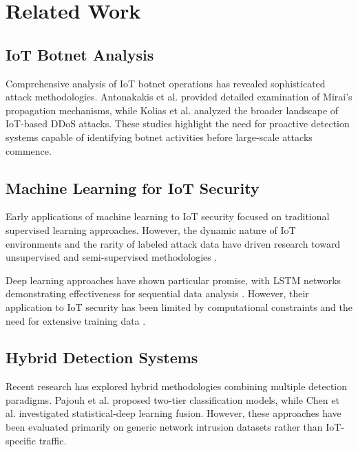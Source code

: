 \documentclass[conference]{IEEEtran}
\begin{document}
\section{Related Work}

\subsection{IoT Botnet Analysis}

Comprehensive analysis of IoT botnet operations has revealed sophisticated attack methodologies. Antonakakis et al. \cite{antonakakis2017understanding} provided detailed examination of Mirai's propagation mechanisms, while Kolias et al. \cite{kolias2017ddos} analyzed the broader landscape of IoT-based DDoS attacks. These studies highlight the need for proactive detection systems capable of identifying botnet activities before large-scale attacks commence.

\subsection{Machine Learning for IoT Security}

Early applications of machine learning to IoT security focused on traditional supervised learning approaches. However, the dynamic nature of IoT environments and the rarity of labeled attack data have driven research toward unsupervised and semi-supervised methodologies \cite{lopez2017network}.

Deep learning approaches have shown particular promise, with LSTM networks demonstrating effectiveness for sequential data analysis \cite{hochreiter1997long}. However, their application to IoT security has been limited by computational constraints and the need for extensive training data \cite{muhammad2018deep}.

\subsection{Hybrid Detection Systems}

Recent research has explored hybrid methodologies combining multiple detection paradigms. Pajouh et al. \cite{pajouh2019two} proposed two-tier classification models, while Chen et al. \cite{chen2019fusion} investigated statistical-deep learning fusion. However, these approaches have been evaluated primarily on generic network intrusion datasets rather than IoT-specific traffic.
\end{document}
